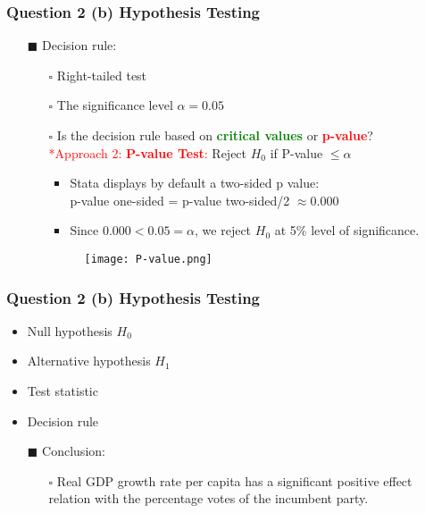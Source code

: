 \documentclass[11pt, xcolor=x11names,compress]{beamer}
\begin{document}
\begin{frame}[fragile,t]
\frametitle{Question 2 (b) Hypothesis Testing} 
\linespread{1.15}
\begin{itemize}
    \item [$\blacksquare$] Decision rule:
    \begin{itemize}
        \item [$\square$] Right-tailed test 
        \item [$\square$] The significance level $\alpha = 0.05$
        \item [$\square$] Is the decision rule based on \textcolor{green}{\textbf{critical values}} or \textcolor{red}{\textbf{p-value}}?\\
        \vspace{2mm}
     \textcolor{red}{*Approach 2: \textbf{P-value Test}:} Reject $H_0$ if P-value $\leq \alpha$
        \begin{itemize}
            \item Stata displays by default a two-sided p value:\\
            p-value one-sided = p-value two-sided/2 $\approx 0.000$ 
            \item Since $0.000 < 0.05 = \alpha$, we reject $H_0$ at 5\% level of significance.
        \end{itemize}
    \vspace{2mm}
    \begin{figure}
        \centering
    \texttt{[image: P-value.png]}
        \caption{}
    \end{figure}
\end{itemize}

\end{itemize}
\end{frame}
\begin{frame}[fragile,t]
\frametitle{Question 2 (b) Hypothesis Testing} 
\linespread{1.15}
\begin{itemize}
    \item Null hypothesis $H_0$
    \item Alternative hypothesis $H_1$
    \item Test statistic
   \item Decision rule
    \item [$\blacksquare$] Conclusion:
    \begin{itemize}
        \item [$\square$] Real GDP growth rate per capita has a significant positive effect relation with the percentage votes of the incumbent
party.
    \end{itemize}
\end{itemize}
\end{frame}
\end{document}
